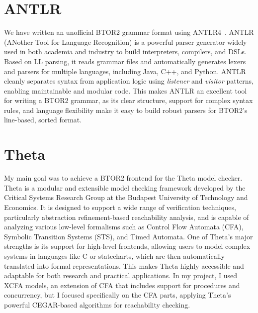 \section{ANTLR}
We have written an unofficial BTOR2 grammar format using ANTLR4~\cite{antlr}.
ANTLR (ANother Tool for Language Recognition) is a powerful parser generator widely used in both academia and industry to build interpreters, compilers, and DSLs. Based on LL parsing, it reads grammar files and automatically generates lexers and parsers for multiple languages, including Java, C++, and Python. ANTLR cleanly separates syntax from application logic using \textit{listener} and \textit{visitor} patterns, enabling maintainable and modular code.
This makes ANTLR an excellent tool for writing a BTOR2 grammar, as its clear structure, support for complex syntax rules, and language flexibility make it easy to build robust parsers for BTOR2's line-based, sorted format.

\section{Theta}
My main goal was to achieve a BTOR2 frontend for the Theta model checker.
Theta is a modular and extensible model checking framework developed by the Critical Systems Research Group at the Budapest University of Technology and Economics. It is designed to support a wide range of verification techniques, particularly abstraction refinement-based reachability analysis, and is capable of analyzing various low-level formalisms such as Control Flow Automata (CFA), Symbolic Transition Systems (STS), and Timed Automata.
One of Theta's major strengths is its support for high-level frontends, allowing users to model complex systems in languages like C or statecharts, which are then automatically translated into formal representations. This makes Theta highly accessible and adaptable for both research and practical applications.
In my project, I used XCFA models, an extension of CFA that includes support for procedures and concurrency, but I focused specifically on the CFA parts, applying Theta's powerful CEGAR-based algorithms for reachability checking.
\cite{theta}

